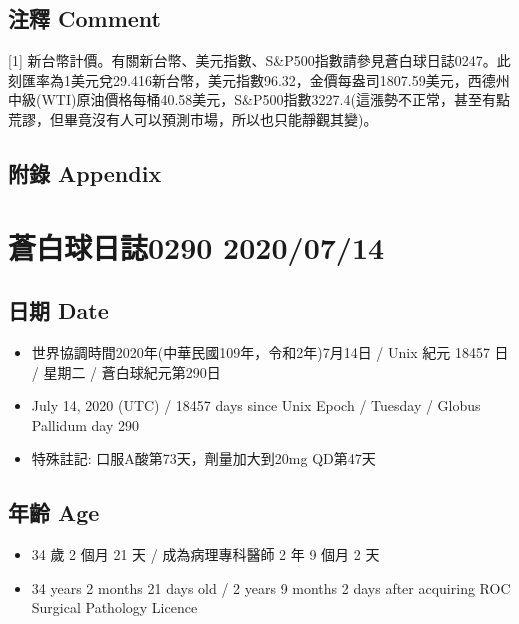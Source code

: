 \documentclass[
]{article}
\providecommand{\tightlist}{%
  \setlength{\itemsep}{0pt}\setlength{\parskip}{0pt}}
\begin{document}
\hypertarget{ux6ce8ux91cb-comment-11}{%
\subsection{注釋 Comment}\label{ux6ce8ux91cb-comment-11}}

{[}1{]}
新台幣計價。有關新台幣、美元指數、S\&P500指數請參見蒼白球日誌0247。此刻匯率為1美元兌29.416新台幣，美元指數96.32，金價每盎司1807.59美元，西德州中級(WTI)原油價格每桶40.58美元，S\&P500指數3227.4(這漲勢不正常，甚至有點荒謬，但畢竟沒有人可以預測市場，所以也只能靜觀其變)。

\hypertarget{ux9644ux9304-appendix-11}{%
\subsection{附錄 Appendix}\label{ux9644ux9304-appendix-11}}

\hypertarget{ux84bcux767dux7403ux65e5ux8a8c0290-20200714}{%
\section{蒼白球日誌0290
2020/07/14}\label{ux84bcux767dux7403ux65e5ux8a8c0290-20200714}}

\hypertarget{ux65e5ux671f-date-12}{%
\subsection{日期 Date}\label{ux65e5ux671f-date-12}}

\begin{itemize}
\tightlist
\item
  世界協調時間2020年(中華民國109年，令和2年)7月14日 / Unix 紀元 18457 日
  / 星期二 / 蒼白球紀元第290日
\item
  July 14, 2020 (UTC) / 18457 days since Unix Epoch / Tuesday / Globus
  Pallidum day 290
\item
  特殊註記: 口服A酸第73天，劑量加大到20mg QD第47天
\end{itemize}

\hypertarget{ux5e74ux9f61-age-12}{%
\subsection{年齡 Age}\label{ux5e74ux9f61-age-12}}

\begin{itemize}
\tightlist
\item
  34 歲 2 個月 21 天 / 成為病理專科醫師 2 年 9 個月 2 天
\item
  34 years 2 months 21 days old / 2 years 9 months 2 days after
  acquiring ROC Surgical Pathology Licence
\end{itemize}
\end{document}
